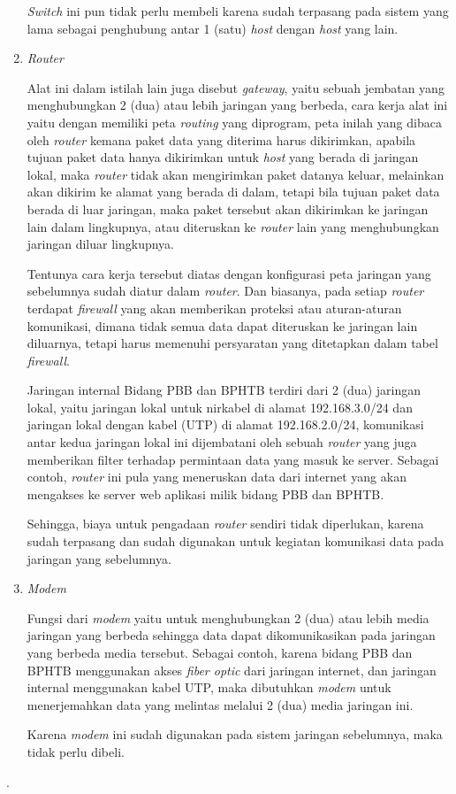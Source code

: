 \documentclass[pdftex,12pt, oneside]{article}
\begin{document}
\begin{enumerate}[1.]
\textit{Switch} ini pun tidak perlu membeli karena sudah terpasang pada sistem yang lama sebagai penghubung antar 1 (satu) \textit{host} dengan \textit{host} yang lain.

  \item \textit{Router}
  
Alat ini dalam istilah lain juga disebut \textit{gateway}, yaitu sebuah jembatan yang menghubungkan 2 (dua) atau lebih jaringan yang berbeda, cara kerja alat ini yaitu dengan memiliki peta \textit{routing} yang diprogram, peta inilah yang dibaca oleh \textit{router} kemana paket data yang diterima harus dikirimkan, apabila tujuan paket data hanya dikirimkan untuk \textit{host} yang berada di jaringan lokal, maka \textit{router} tidak akan mengirimkan paket datanya keluar, melainkan akan dikirim ke alamat yang berada di dalam, tetapi bila tujuan paket data berada di luar jaringan, maka paket tersebut akan dikirimkan ke jaringan lain dalam lingkupnya, atau diteruskan ke \textit{router} lain yang menghubungkan jaringan diluar lingkupnya. 

Tentunya cara kerja tersebut diatas dengan konfigurasi peta jaringan yang sebelumnya sudah diatur dalam \textit{router}. Dan biasanya, pada setiap \textit{router} terdapat \textit{firewall} yang akan memberikan proteksi atau aturan-aturan komunikasi, dimana tidak semua data dapat diteruskan ke jaringan lain diluarnya, tetapi harus memenuhi persyaratan yang ditetapkan dalam tabel \textit{firewall}.

Jaringan internal Bidang PBB dan BPHTB terdiri dari 2 (dua) jaringan lokal, yaitu jaringan lokal untuk nirkabel di alamat 192.168.3.0/24 dan jaringan lokal dengan kabel (UTP) di alamat 192.168.2.0/24, komunikasi antar kedua jaringan lokal ini dijembatani oleh sebuah \textit{router} yang juga memberikan filter terhadap permintaan data yang masuk ke server. Sebagai contoh, \textit{router} ini pula yang meneruskan data dari internet yang akan mengakses ke server web aplikasi milik bidang PBB dan BPHTB.

Sehingga, biaya untuk pengadaan \textit{router} sendiri tidak diperlukan, karena sudah terpasang dan sudah digunakan untuk kegiatan komunikasi data pada jaringan yang sebelumnya.

  \item \textit{Modem}
  
Fungsi dari \textit{modem} yaitu untuk menghubungkan 2 (dua) atau lebih media jaringan yang berbeda sehingga data dapat dikomunikasikan pada jaringan yang berbeda media tersebut. Sebagai contoh, karena bidang PBB dan BPHTB menggunakan akses \textit{fiber optic} dari jaringan internet, dan jaringan internal menggunakan kabel UTP, maka dibutuhkan \textit{modem} untuk menerjemahkan data yang melintas melalui 2 (dua) media jaringan ini.

Karena \textit{modem} ini sudah digunakan pada sistem jaringan sebelumnya, maka tidak perlu dibeli.

\end{enumerate}.
\end{document}
